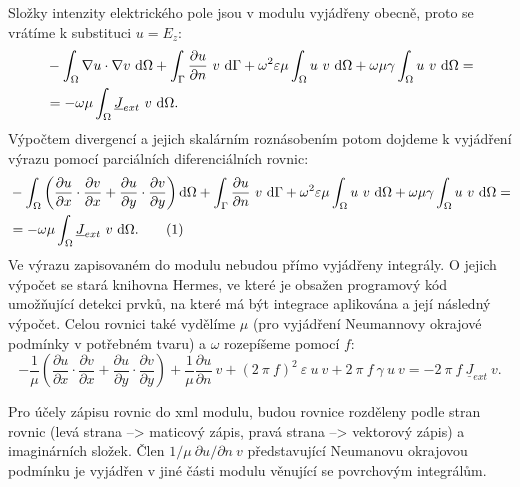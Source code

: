 \documentclass[12pt,a4paper,oneside]{article}
\numberwithin{equation}{section} %
\numberwithin{figure}{section} %
\numberwithin{table}{section} %
\newcommand{\faz}[1]{{\underline{#1}}} %
\newcommand\numberthis{\addtocounter{equation}{1}\tag{\theequation}}
\begin{document}
Složky intenzity elektrického pole jsou v modulu vyjádřeny obecně, proto se vrátíme k substituci $u = E_z$:
\begin{equation}
\begin{split}
&- \int _{\Omega} \nabla u \cdot \nabla v ~ \ud \Omega + \int _{\Gamma} \frac{\partial u}{\partial n} ~ v ~ \ud \Gamma + \omega ^2 \varepsilon \mu \int _{\Omega} u ~ v ~ \ud \Omega + \omega \mu \gamma \int _{\Omega} u ~ v ~ \ud \Omega =\\
&= - \omega \mu \int _{\Omega} \faz{J} _{ext} ~ v ~ \ud \Omega .
\end{split}
\end{equation}
Výpočtem divergencí a jejich skalárním roznásobením potom dojdeme k vyjádření výrazu pomocí parciálních diferenciálních rovnic:
\begin{align*}
&- \int _{\Omega} \left( \frac{\partial u}{\partial x} \cdot \frac{\partial v}{\partial x} + \frac{\partial u}{\partial y} \cdot \frac{\partial v}{\partial y} \right) \ud \Omega + \int _{\Gamma} \frac{\partial u}{\partial n} ~ v ~ \ud \Gamma + \omega ^2 \varepsilon \mu \int _{\Omega} u ~ v ~ \ud \Omega + \omega \mu \gamma \int _{\Omega} u ~ v ~ \ud \Omega =\\
&= - \omega \mu \int _{\Omega} \faz{J} _{ext} ~ v ~ \ud \Omega .
\numberthis
\end{align*}
Ve výrazu zapisovaném do modulu nebudou přímo vyjádřeny integrály. O jejich výpočet se stará knihovna Hermes, ve které je obsažen programový kód umožňující detekci prvků, na které má být integrace aplikována a její následný výpočet. Celou rovnici také vydělíme $\mu$ (pro vyjádření Neumannovy okrajové podmínky v potřebném tvaru) a $\omega$ rozepíšeme pomocí $f$:
\begin{equation}
\label{EzWeakEpsilon}
- \frac{1}{\mu} \left( \frac{\partial u}{\partial x} \cdot \frac{\partial v}{\partial x} + \frac{\partial u}{\partial y} \cdot \frac{\partial v}{\partial y} \right) + \frac{1}{\mu} \frac{\partial u}{\partial n} ~ v + (2 ~ \pi ~ f) ^2 ~ \varepsilon ~ u ~ v + 2 ~ \pi ~ f ~ \gamma ~ u ~ v = - 2 ~ \pi ~ f ~ \faz{J} _{ext} ~ v .
\end{equation}

Pro účely zápisu rovnic do xml modulu, budou rovnice rozděleny podle stran rovnic (levá strana --> maticový zápis, pravá strana --> vektorový zápis) a imaginárních složek. Člen $1/ \mu ~ \partial u / \partial n ~ v$ představující Neumanovu okrajovou podmínku je vyjádřen v jiné části modulu věnující se povrchovým integrálům.
\end{document}
